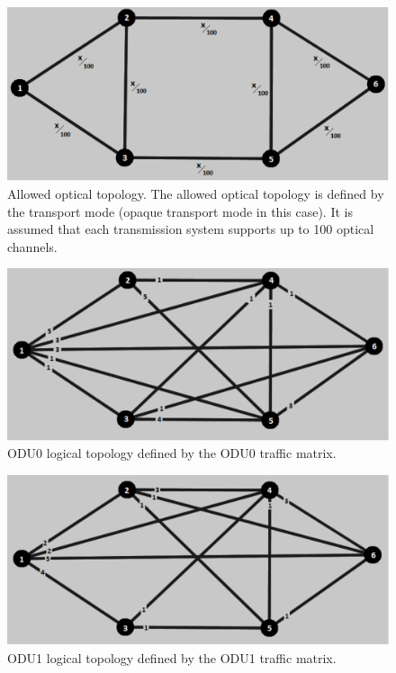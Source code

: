 \begin{figure}[H]
\centering
\includegraphics[width=13cm]{sdf/heuristic/opaque_survivability/figures/allowed_optical}
\caption{Allowed optical topology. The allowed optical topology is defined by the transport mode (opaque transport mode in this case). It is assumed that each transmission system supports up to 100 optical channels.}
\label{allowed_optical_surv_ref_low_heuristic}
\end{figure}

\begin{figure}[H]
\centering
\includegraphics[width=13cm]{sdf/heuristic/opaque_survivability/figures/logical_topology_odu0_low}
\caption{ODU0 logical topology defined by the ODU0 traffic matrix.}
\label{logical_ODU0_surv_ref_low_heuristic}
\end{figure}

\begin{figure}[H]
\centering
\includegraphics[width=13cm]{sdf/heuristic/opaque_survivability/figures/logical_topology_odu1_low}
\caption{ODU1 logical topology defined by the ODU1 traffic matrix.}
\label{logical_ODU1_surv_ref_low_heuristic}
\end{figure}

